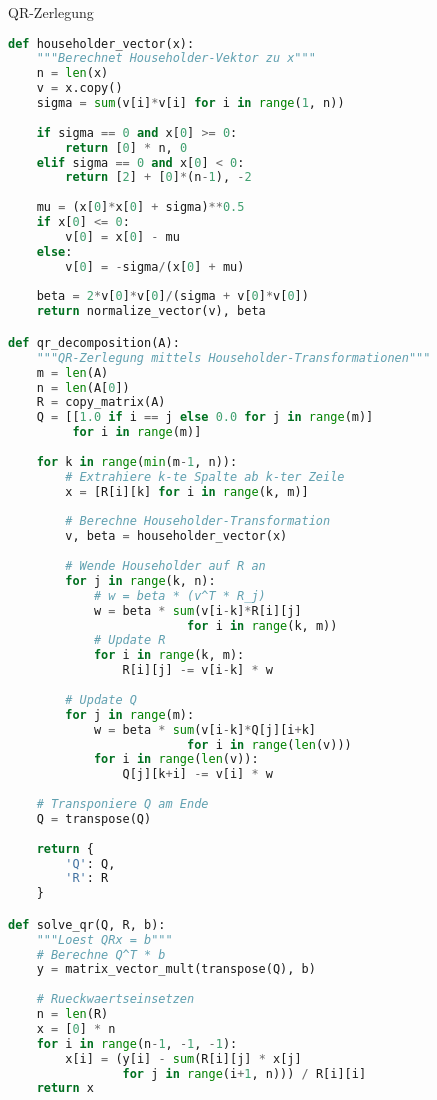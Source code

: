 \begin{examplecode}{QR-Zerlegung}
\begin{lstlisting}[language=Python, style=basesmol]
def householder_vector(x):
    """Berechnet Householder-Vektor zu x"""
    n = len(x)
    v = x.copy()
    sigma = sum(v[i]*v[i] for i in range(1, n))
    
    if sigma == 0 and x[0] >= 0:
        return [0] * n, 0
    elif sigma == 0 and x[0] < 0:
        return [2] + [0]*(n-1), -2
        
    mu = (x[0]*x[0] + sigma)**0.5
    if x[0] <= 0:
        v[0] = x[0] - mu
    else:
        v[0] = -sigma/(x[0] + mu)
        
    beta = 2*v[0]*v[0]/(sigma + v[0]*v[0])
    return normalize_vector(v), beta

def qr_decomposition(A):
    """QR-Zerlegung mittels Householder-Transformationen"""
    m = len(A)
    n = len(A[0])
    R = copy_matrix(A)
    Q = [[1.0 if i == j else 0.0 for j in range(m)] 
         for i in range(m)]
    
    for k in range(min(m-1, n)):
        # Extrahiere k-te Spalte ab k-ter Zeile
        x = [R[i][k] for i in range(k, m)]
        
        # Berechne Householder-Transformation
        v, beta = householder_vector(x)
        
        # Wende Householder auf R an
        for j in range(k, n):
            # w = beta * (v^T * R_j)
            w = beta * sum(v[i-k]*R[i][j] 
                         for i in range(k, m))
            # Update R
            for i in range(k, m):
                R[i][j] -= v[i-k] * w
                
        # Update Q
        for j in range(m):
            w = beta * sum(v[i-k]*Q[j][i+k] 
                         for i in range(len(v)))
            for i in range(len(v)):
                Q[j][k+i] -= v[i] * w
                
    # Transponiere Q am Ende
    Q = transpose(Q)
    
    return {
        'Q': Q,
        'R': R
    }

def solve_qr(Q, R, b):
    """Loest QRx = b"""
    # Berechne Q^T * b
    y = matrix_vector_mult(transpose(Q), b)
    
    # Rueckwaertseinsetzen
    n = len(R)
    x = [0] * n
    for i in range(n-1, -1, -1):
        x[i] = (y[i] - sum(R[i][j] * x[j] 
                for j in range(i+1, n))) / R[i][i]
    return x
\end{lstlisting}
\end{examplecode}

